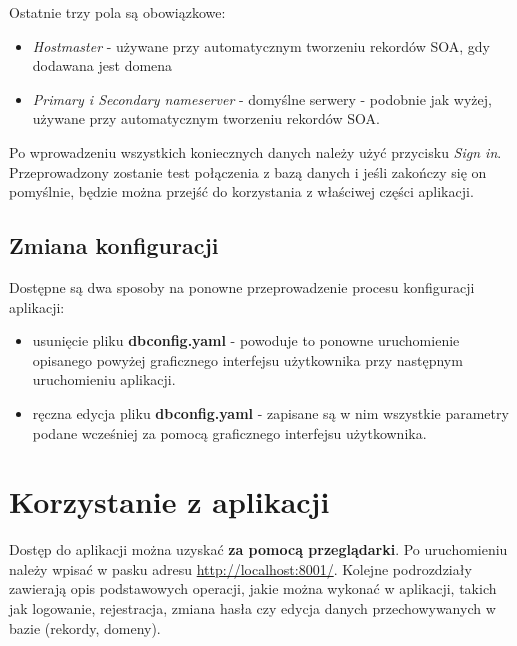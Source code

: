\documentclass[12pt] {article}
\begin{document}
Ostatnie trzy pola są obowiązkowe:
\begin{itemize}
\item \emph{Hostmaster} - używane przy automatycznym tworzeniu rekordów SOA, gdy dodawana jest domena
\item \emph{Primary i Secondary nameserver} - domyślne serwery - podobnie jak wyżej, używane przy automatycznym tworzeniu rekordów SOA.
\end{itemize}
Po wprowadzeniu wszystkich koniecznych danych należy użyć przycisku \emph{Sign in}. Przeprowadzony zostanie test połączenia z bazą danych i jeśli zakończy się on pomyślnie, będzie można przejść do korzystania z właściwej części aplikacji.

\subsection{Zmiana konfiguracji}
Dostępne są dwa sposoby na ponowne przeprowadzenie procesu konfiguracji aplikacji:
\begin{itemize}
\item usunięcie pliku \textbf{dbconfig.yaml} - powoduje to ponowne uruchomienie opisanego powyżej graficznego interfejsu użytkownika przy następnym uruchomieniu aplikacji.
\item ręczna edycja pliku \textbf{dbconfig.yaml} - zapisane są w nim wszystkie parametry podane wcześniej za pomocą graficznego interfejsu użytkownika.
\end{itemize}

\section{Korzystanie z aplikacji}
Dostęp do aplikacji można uzyskać \textbf{za pomocą przeglądarki}. Po uruchomieniu należy wpisać w pasku adresu \url{http://localhost:8001/}. \newline
Kolejne podrozdziały zawierają opis podstawowych operacji, jakie można wykonać w aplikacji, takich jak logowanie, rejestracja, zmiana hasła czy edycja danych przechowywanych w bazie (rekordy, domeny).
\end{document}
